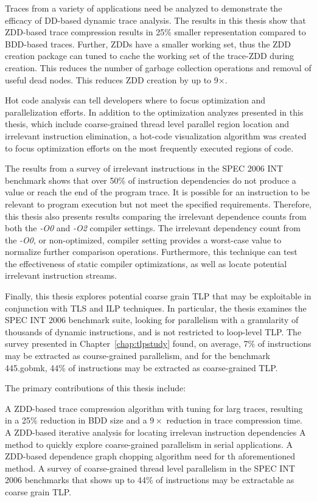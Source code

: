 {Traces from a variety of applications need be analyzed to demonstrate the efficacy of DD-based dynamic trace analysis. The results in this thesis show that ZDD-based trace compression results in 25\% smaller representation compared to BDD-based traces.  Further, ZDDs have a smaller working set, thus the ZDD creation package can tuned to cache the working set of the trace-ZDD during creation.  This reduces the number of garbage collection operations and removal of useful dead nodes. This reduces ZDD creation by up to 9$\times$.

Hot code analysis can tell developers where to focus optimization and parallelization efforts. In addition to the optimization analyzes presented in this thesis, which include coarse-grained thread level parallel region location and irrelevant instruction elimination, a hot-code visualization algorithm was created to focus optimization efforts on the most frequently executed regions of code.

The results from a survey of irrelevant instructions in the SPEC 2006 INT benchmark shows that over 50\% of instruction dependencies do not produce a value or reach the end of the program trace.  It is possible for an instruction to be relevant to program execution but not meet the specified requirements.  Therefore, this thesis also presents results comparing the irrelevant dependence counts from both the \textit{-O0} and \textit{-O2} compiler settings. The irrelevant dependency count from the \textit{-O0}, or non-optimized, compiler setting provides a worst-case value to normalize further comparison operations.  Furthermore, this technique can test the effectiveness of static compiler optimizations, as well as locate potential irrelevant instruction streams.

Finally, this thesis explores potential coarse grain TLP that may be exploitable in conjunction with TLS and ILP techniques.  In particular, the thesis examines the SPEC INT 2006 benchmark suite, looking for parallelism with a granularity of thousands of dynamic instructions, and is not restricted to loop-level TLP. The survey presented in Chapter~\ref{chap:tlpstudy} found, on average, 7\% of instructions may be extracted as course-grained parallelism, and for the benchmark 445.gobmk, 44\% of instructions may be extracted as coarse-grained TLP.

The primary contributions of this thesis include:

 A ZDD-based trace compression algorithm with tuning for larg
 traces, resulting in a 25\% reduction in BDD size and a $9\times$ reduction in trace compression time. A ZDD-based iterative analysis for locating irrelevan
 instruction dependencies A method to quickly explore coarse-grained parallelism in serial
 applications. A ZDD-based dependence graph chopping algorithm need for th
 aforementioned method. A survey of coarse-grained thread level parallelism in the SPEC
 INT 2006 benchmarks that shows up to 44\% of instructions may be extractable as coarse grain TLP.

}
